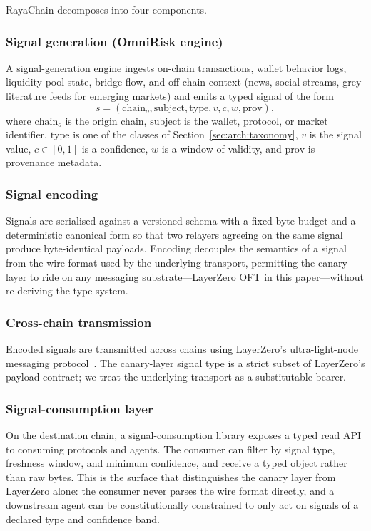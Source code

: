 \documentclass[journal]{IEEEtran}
\begin{document}
RayaChain decomposes into four components.

\subsubsection*{Signal generation (OmniRisk engine)}
A signal-generation engine ingests on-chain transactions, wallet
behavior logs, liquidity-pool state, bridge flow, and off-chain
context (news, social streams, grey-literature feeds for emerging
markets) and emits a typed signal of the form
\[
s = (\text{chain}_o, \text{subject}, \text{type}, v, c, w, \text{prov}),
\]
where $\text{chain}_o$ is the origin chain, $\text{subject}$ is the
wallet, protocol, or market identifier, $\text{type}$ is one of the
classes of Section~\ref{sec:arch:taxonomy}, $v$ is the signal value,
$c \in [0,1]$ is a confidence, $w$ is a window of validity, and
$\text{prov}$ is provenance metadata.

\subsubsection*{Signal encoding}
Signals are serialised against a versioned schema with a fixed byte
budget and a deterministic canonical form so that two relayers agreeing
on the same signal produce byte-identical payloads. Encoding decouples
the semantics of a signal from the wire format used by the underlying
transport, permitting the canary layer to ride on any messaging
substrate---LayerZero OFT in this paper---without re-deriving the
type system.

\subsubsection*{Cross-chain transmission}
Encoded signals are transmitted across chains using LayerZero's
ultra-light-node messaging protocol~\cite{abs-2110-13871}. The
canary-layer signal type is a strict subset of LayerZero's payload
contract; we treat the underlying transport as a substitutable bearer.

\subsubsection*{Signal-consumption layer}
On the destination chain, a signal-consumption library exposes a
typed read API to consuming protocols and agents. The consumer can
filter by signal type, freshness window, and minimum confidence, and
receive a typed object rather than raw bytes. This is the surface that
distinguishes the canary layer from LayerZero alone: the consumer never
parses the wire format directly, and a downstream agent can be
constitutionally constrained to only act on signals of a declared
type and confidence band.
\end{document}
